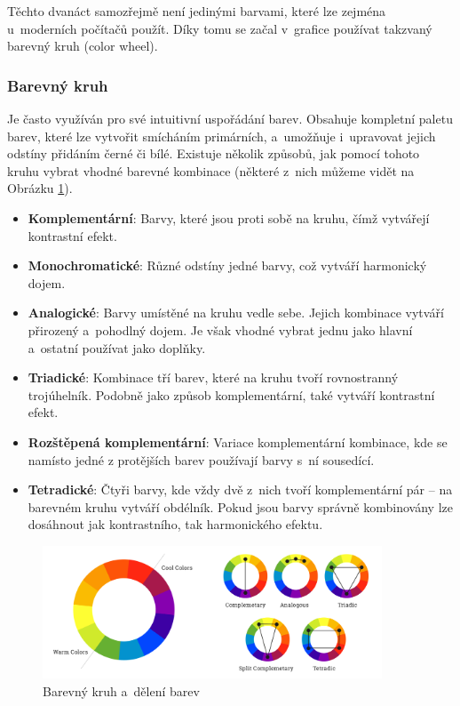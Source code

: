 Těchto dvanáct samozřejmě není jedinými barvami, které lze zejména u~moderních počítačů použít. Díky tomu se začal v~grafice používat takzvaný barevný kruh (color wheel). \cite{color_theory_design}

\subsubsection*{Barevný kruh}
Je často využíván pro své intuitivní uspořádání barev. Obsahuje kompletní paletu barev, které lze vytvořit smícháním primárních, a~umožňuje i~upravovat jejich odstíny přidáním černé či bílé. Existuje několik způsobů, jak pomocí tohoto kruhu vybrat vhodné barevné kombinace (některé z~nich můžeme vidět na Obrázku \ref{fig:color_theory}). \cite{color_wheel,color_schemes}
\begin{itemize}
    \item \textbf{Komplementární}: Barvy, které jsou proti sobě na kruhu, čímž vytvářejí kontrastní efekt.
    \item \textbf{Monochromatické}: Různé odstíny jedné barvy, což vytváří harmonický dojem.
    \item \textbf{Analogické}: Barvy umístěné na kruhu vedle sebe. Jejich kombinace vytváří přirozený a~pohodlný dojem. Je však vhodné vybrat jednu jako hlavní a~ostatní používat jako doplňky.
    \item \textbf{Triadické}: Kombinace tří barev, které na kruhu tvoří rovnostranný trojúhelník. Podobně jako způsob komplementární, také vytváří kontrastní efekt.
    \item \textbf{Rozštěpená komplementární}: Variace komplementární kombinace, kde se namísto jedné z protějších barev používají barvy s~ní sousedící.
    \item \textbf{Tetradické}: Čtyři barvy, kde vždy dvě z~nich tvoří komplementární pár -- na barevném kruhu vytváří obdélník. Pokud jsou barvy správně kombinovány lze dosáhnout jak kontrastního, tak harmonického efektu.
\end{itemize}

\begin{figure}[H]
    \centering
    \includegraphics[width=0.9\textwidth]{resources/figures/color_theory.png}
    \caption{Barevný kruh a~dělení barev \cite{color_schemes}}
    \label{fig:color_theory}
\end{figure}

